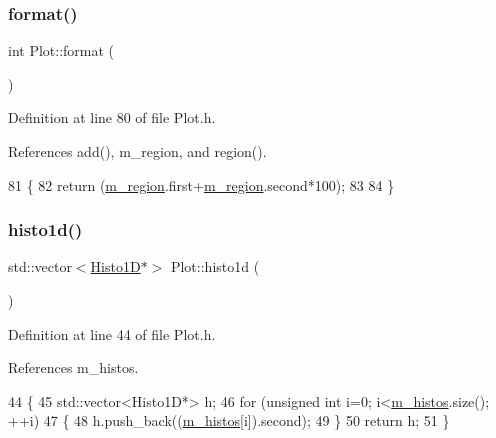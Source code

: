 \subsubsection{\texorpdfstring{format()}{format()}}
{\footnotesize\ttfamily int Plot\+::format (\begin{DoxyParamCaption}{ }\end{DoxyParamCaption})\hspace{0.3cm}{\ttfamily [inline]}}



Definition at line 80 of file Plot.\+h.



References add(), m\+\_\+region, and region().


\begin{DoxyCode}
81   \{
82     \textcolor{keywordflow}{return} (\hyperlink{classPlot_aabcbba1cfc66babcbcd647fdf90cdbf1}{m\_region}.first+\hyperlink{classPlot_aabcbba1cfc66babcbcd647fdf90cdbf1}{m\_region}.second*100);
83 
84   \}
\end{DoxyCode}
\mbox{\label{classPlot_ad6f34fe5ab1a94b411b4fc121e0641bc}} 
\subsubsection{\texorpdfstring{histo1d()}{histo1d()}}
{\footnotesize\ttfamily std\+::vector$<$\hyperlink{classHisto1D}{Histo1D}$\ast$$>$ Plot\+::histo1d (\begin{DoxyParamCaption}{ }\end{DoxyParamCaption})\hspace{0.3cm}{\ttfamily [inline]}}



Definition at line 44 of file Plot.\+h.



References m\+\_\+histos.


\begin{DoxyCode}
44                                \{
45     std::vector<Histo1D*> h;
46     \textcolor{keywordflow}{for} (\textcolor{keywordtype}{unsigned} \textcolor{keywordtype}{int} i=0; i<\hyperlink{classPlot_a7edebf2b275223b8ce55f6ef3b2da0cc}{m\_histos}.size(); ++i)
47     \{
48       h.push\_back((\hyperlink{classPlot_a7edebf2b275223b8ce55f6ef3b2da0cc}{m\_histos}[i]).second);
49     \}
50     \textcolor{keywordflow}{return} h;
51   \}
\end{DoxyCode}
\mbox{\label{classPlot_af72e70c6b53df941708cd8d971083227}} 
